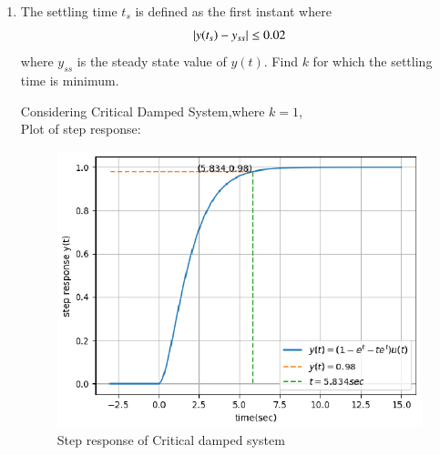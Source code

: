 \begin{enumerate}[label=\thesubsection.\arabic*.,ref=\thesubsection.\theenumi]
\item  The settling time $t_s$ is defined as the first instant where
%
\begin{align}
\left\vert y(t_s)-y_{ss}\right\vert \le 0.02
\end{align}
where $y_{ss}$ is the steady state value of $y(t)$.  Find $k$ for which the settling time is minimum.
%

\solution Considering Critical Damped System,where $k=1$,\\
Plot of step response:
\begin{figure}[!h]
  \includegraphics[width=\columnwidth]{./figures/ee18btech11035_1.eps}
  \caption{Step response of Critical damped system}
  \label{fig:ee18btech11035_1}
\end{figure}


\end{enumerate}
